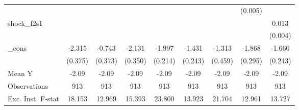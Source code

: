{\begin{tabular}{l*{8}{c}}
            &                     &                     &                     &                     &                     &                     &     (0.005)         &                     \\
\addlinespace
shock\_f2s1  &                     &                     &                     &                     &                     &                     &                     &       0.013\sym{***}\\
            &                     &                     &                     &                     &                     &                     &                     &     (0.004)         \\
\addlinespace
\_cons      &      -2.315\sym{***}&      -0.743\sym{*}  &      -2.131\sym{***}&      -1.997\sym{***}&      -1.431\sym{***}&      -1.313\sym{***}&      -1.868\sym{***}&      -1.660\sym{***}\\
            &     (0.375)         &     (0.373)         &     (0.350)         &     (0.214)         &     (0.243)         &     (0.459)         &     (0.295)         &     (0.243)         \\
\midrule
Mean Y      &       -2.09         &       -2.09         &       -2.09         &       -2.09         &       -2.09         &       -2.09         &       -2.09         &       -2.09         \\
Observations&         913         &         913         &         913         &         913         &         913         &         913         &         913         &         913         \\
Exc. Inst. F-stat&      18.153         &      12.969         &      15.393         &      23.800         &      13.923         &      21.704         &      12.961         &      13.727         \\
\bottomrule
\end{tabular}
}
